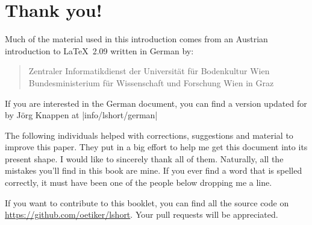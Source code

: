 \chapter{Thank you!}
\noindent Much of the material used in this introduction comes from an
Austrian introduction to \LaTeX\ 2.09 written in German by:
\begin{verse}
  {Zentraler Informatikdienst der Universit\"at f\"ur Bodenkultur Wien}
  {Bundesministerium f\"ur Wissenschaft und Forschung Wien}
  {in Graz}
\end{verse}

If you are interested in the German document, you can find a version
updated for \LaTeXe{} by J\"org Knappen at
\CTAN|info/lshort/german|

\newpage \noindent The
following individuals helped with corrections, suggestions and
material to improve this paper. They put in a big effort to help me
get this document into its present shape. I would like to
sincerely thank all of them. Naturally, all the mistakes you'll find
in this book are mine. If you ever find a word that is spelled
correctly, it must have been one of the people below dropping me a
line.

If you want to contribute to this booklet, you can find all the source code
on \url{https://github.com/oetiker/lshort}. Your pull requests will be
appreciated.

